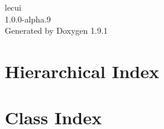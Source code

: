 \let\mypdfximage\pdfximage\def\pdfximage{\immediate\mypdfximage}\documentclass[twoside]{book}
\newcommand{\+}{\discretionary{\mbox{\scriptsize$\hookleftarrow$}}{}{}}
\newcommand{\clearemptydoublepage}{%
  \newpage{\pagestyle{empty}\cleardoublepage}%
}
\begin{document}
\raggedbottom

\hypersetup{pageanchor=false,
             bookmarksnumbered=true,
             pdfencoding=unicode
            }
\begin{titlepage}
\vspace*{7cm}
\begin{center}%
{\Large lecui \\[1ex]\large 1.\+0.\+0-\/alpha.\+9 }\\
\vspace*{1cm}
{\large Generated by Doxygen 1.9.1}\\
\end{center}
\end{titlepage}
\clearemptydoublepage
{}
\tableofcontents
\clearemptydoublepage
{}
\hypersetup{pageanchor=true}

\chapter{Hierarchical Index}

\chapter{Class Index}

\end{document}
